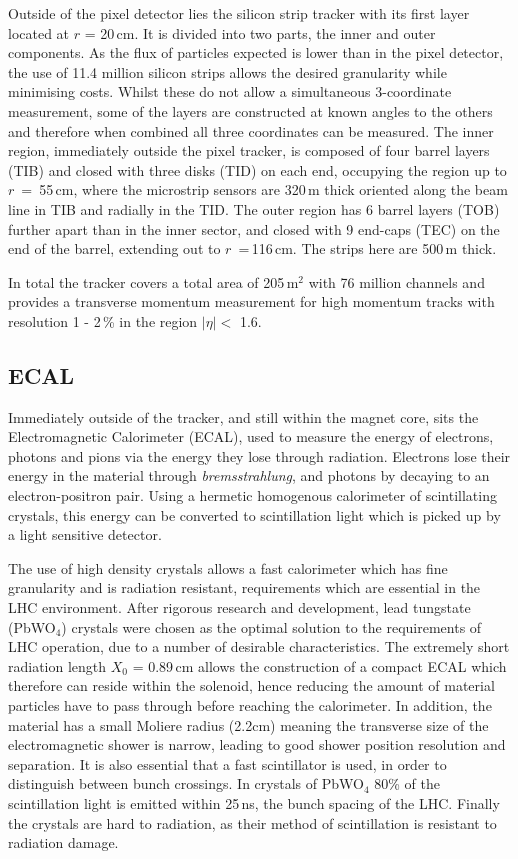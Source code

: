 Outside of the pixel detector lies the silicon strip tracker with its first layer located at $r$ = 20\,cm. It is divided into two parts, the inner and outer components. As the flux of particles expected is lower than in the pixel detector, the use of 11.4 million silicon strips allows the desired granularity while minimising costs. Whilst these do not allow a simultaneous 3-coordinate measurement, some of the layers are constructed at known angles to the others and therefore when combined all three coordinates can be measured. The inner region, immediately outside the pixel tracker, is composed of four barrel layers (TIB) and closed with three disks (TID) on each end, occupying the region up to $r$~=~55\,cm, where the microstrip sensors are 320\,\textmu m thick oriented along the beam line in TIB and radially in the TID. The outer region has 6 barrel layers (TOB) further apart than in the inner sector, and closed with 9 end-caps (TEC) on the end of the barrel, extending out to $r$~=\,116\,cm. The strips here are 500\,\textmu m thick.

In total the tracker covers a total area of 205\,m$^{2}$ with 76 million channels and provides a transverse momentum measurement for high momentum tracks with resolution 1 - 2\,\% in the region $|\eta| <$ 1.6.

\subsection{ECAL}

Immediately outside of the tracker, and still within the magnet core, sits the Electromagnetic Calorimeter (ECAL), used to measure the energy of electrons, photons and pions via the energy they lose through radiation. Electrons lose their energy in the material through \textit{bremsstrahlung}, and photons by decaying to an electron-positron pair. Using a hermetic homogenous calorimeter of scintillating crystals, this energy can be converted to scintillation light which is picked up by a light sensitive detector. 

The use of high density crystals allows a fast calorimeter which has fine granularity and is radiation resistant, requirements which are essential in the LHC environment. After rigorous research and development, lead tungstate (PbWO$_{4}$) crystals were chosen as the optimal solution to the requirements of LHC operation, due to a number of desirable characteristics. The extremely short radiation length $X_{0}$ = 0.89\,cm allows the construction of a compact ECAL which therefore can reside within the solenoid, hence reducing the amount of material particles have to pass through before reaching the calorimeter. In addition, the material has a small Moliere radius (2.2cm) meaning the transverse size of the electromagnetic shower is narrow, leading to good shower position resolution and separation. It is also essential that a fast scintillator is used, in order to distinguish between bunch crossings. In crystals of PbWO$_{4}$ 80\% of the scintillation light is emitted within 25\,ns, the bunch spacing of the LHC. Finally the crystals are hard to radiation, as their method of scintillation is resistant to radiation damage. 


